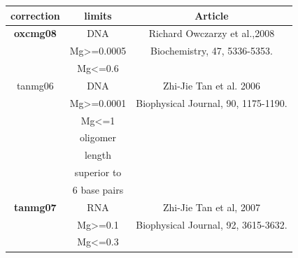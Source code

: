 \documentclass{article}
\begin{document}
 \begin{table}[hc]
\begin{tabular}[h]{| c | c | c |}
\textbf{correction} & \textbf{limits} & \textbf{Article} \\ 
\hline
\textbf{oxcmg08} & DNA & Richard Owczarzy et al.,2008 \\
 & Mg>=0.0005 & Biochemistry, 47, 5336-5353. \\
 & Mg<=0.6 & \\
 \hline
tanmg06 & DNA & Zhi-Jie Tan et al. 2006 \\
 & Mg>=0.0001 & Biophysical Journal, 90, 1175-1190. \\
 & Mg<=1 & \\
 & oligomer & \\
 & length & \\
 & superior to & \\
 & 6 base pairs & \\
 \hline
\textbf{tanmg07} & RNA & Zhi-Jie Tan et al, 2007 \\
 & Mg>=0.1 & Biophysical Journal, 92, 3615-3632. \\
 & Mg<=0.3 & \\
 \hline
\end{tabular}
\end{table}

\pagebreak
\end{document}
